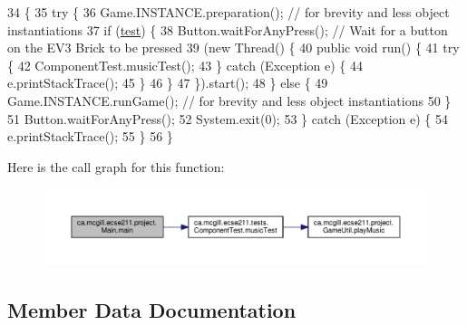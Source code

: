 \begin{DoxyCode}
34                                          \{
35     \textcolor{keywordflow}{try} \{
36       Game.INSTANCE.preparation(); \textcolor{comment}{// for brevity and less object instantiations}
37       \textcolor{keywordflow}{if} (\hyperlink{classca_1_1mcgill_1_1ecse211_1_1project_1_1_main_af6f7b8fffddcf855f74fe128d2e23ea1}{test}) \{
38         Button.waitForAnyPress(); \textcolor{comment}{// Wait for a button on the EV3 Brick to be pressed}
39         (\textcolor{keyword}{new} Thread() \{
40           \textcolor{keyword}{public} \textcolor{keywordtype}{void} run() \{
41             \textcolor{keywordflow}{try} \{
42               ComponentTest.musicTest();
43             \} \textcolor{keywordflow}{catch} (Exception e) \{
44               e.printStackTrace();
45             \}
46           \}
47         \}).start();
48       \} \textcolor{keywordflow}{else} \{
49         Game.INSTANCE.runGame(); \textcolor{comment}{// for brevity and less object instantiations}
50       \}
51       Button.waitForAnyPress();
52       System.exit(0);
53     \} \textcolor{keywordflow}{catch} (Exception e) \{
54       e.printStackTrace();
55     \}
56   \}
\end{DoxyCode}
Here is the call graph for this function\+:\nopagebreak
\begin{figure}[H]
\begin{center}
\leavevmode
\includegraphics[width=350pt]{classca_1_1mcgill_1_1ecse211_1_1project_1_1_main_af681b5dc675c13ed284071cc135f5fd3_cgraph}
\end{center}
\end{figure}


\subsection{Member Data Documentation}
\mbox{\label{classca_1_1mcgill_1_1ecse211_1_1project_1_1_main_af6f7b8fffddcf855f74fe128d2e23ea1}} 
